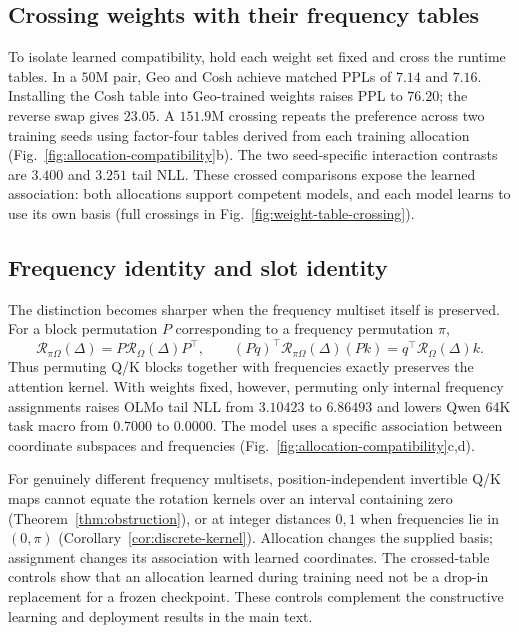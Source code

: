 \subsection{Crossing weights with their frequency tables}
\label{sec:coadaptation-finding}

To isolate learned compatibility, hold each weight set fixed and cross the runtime tables. In a $50$M pair, Geo and Cosh achieve matched PPLs of $7.14$ and $7.16$. Installing the Cosh table into Geo-trained weights raises PPL to $76.20$; the reverse swap gives $23.05$. A $151.9$M crossing repeats the preference across two training seeds using factor-four tables derived from each training allocation (Fig.~\ref{fig:allocation-compatibility}b). The two seed-specific interaction contrasts are $3.400$ and $3.251$ tail NLL. These crossed comparisons expose the learned association: both allocations support competent models, and each model learns to use its own basis (full crossings in Fig.~\ref{fig:weight-table-crossing}).

\subsection{Frequency identity and slot identity}
\label{sec:non-identifiability}

The distinction becomes sharper when the frequency multiset itself is preserved. For a block permutation $P$ corresponding to a frequency permutation $\pi$,
\begin{equation}
\mathcal R_{\pi\Omega}(\Delta)=P\mathcal R_\Omega(\Delta)P^\top,
\qquad (Pq)^\top\mathcal R_{\pi\Omega}(\Delta)(Pk)=q^\top\mathcal R_\Omega(\Delta)k.
\label{eq:slot-permutation}
\end{equation}
Thus permuting Q/K blocks together with frequencies exactly preserves the attention kernel. With weights fixed, however, permuting only internal frequency assignments raises OLMo tail NLL from $3.10423$ to $6.86493$ and lowers Qwen $64$K task macro from $0.7000$ to $0.0000$. The model uses a specific association between coordinate subspaces and frequencies (Fig.~\ref{fig:allocation-compatibility}c,d).

For genuinely different frequency multisets, position-independent invertible Q/K maps cannot equate the rotation kernels over an interval containing zero (Theorem~\ref{thm:obstruction}), or at integer distances $0,1$ when frequencies lie in $(0,\pi)$ (Corollary~\ref{cor:discrete-kernel}). Allocation changes the supplied basis; assignment changes its association with learned coordinates. The crossed-table controls show that an allocation learned during training need not be a drop-in replacement for a frozen checkpoint. These controls complement the constructive learning and deployment results in the main text.
\FloatBarrier

